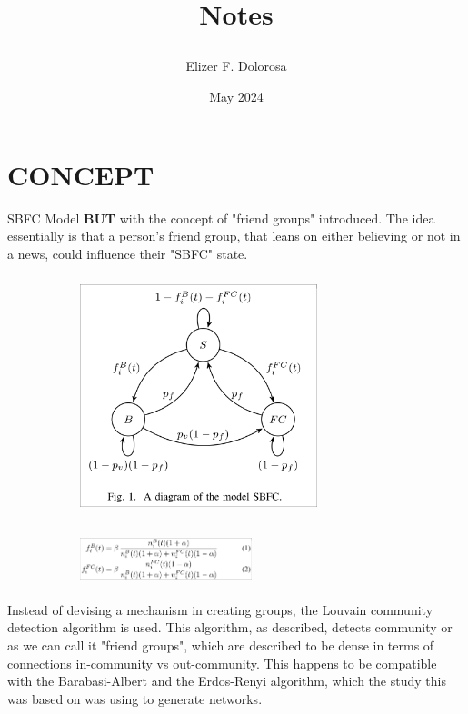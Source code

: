 \documentclass{article}
\title{

  Notes
}
\author{Elizer F. Dolorosa}
\date{May 2024}
\begin{document}
\maketitle

\section{CONCEPT}
SBFC Model \textbf{BUT} with the concept of "friend groups" introduced. The idea essentially is that a person's friend group, that leans on either believing or not in a news, could influence their "SBFC" state.

\begin{figure}[h]
  \begin{subfigure}{0.57\textwidth}
    \includegraphics[align=c,width=6.9cm, height=7cm]{sbfc-diagram.png}
  \end{subfigure}
  \begin{subfigure}{0.42\textwidth}
    \includegraphics[align=c,width=5cm, height=1.5cm]{transmission-eq.png}
  \end{subfigure}
\end{figure}

Instead of devising a mechanism in creating groups, the Louvain
community detection algorithm is used. This algorithm, as described,
detects community or as we can call it "friend groups", which are
described to be dense in terms of connections in-community vs out-community.
This happens to be compatible with the Barabasi-Albert and the Erdos-Renyi
algorithm, which the study this was based on was using to generate networks.
\end{document}
